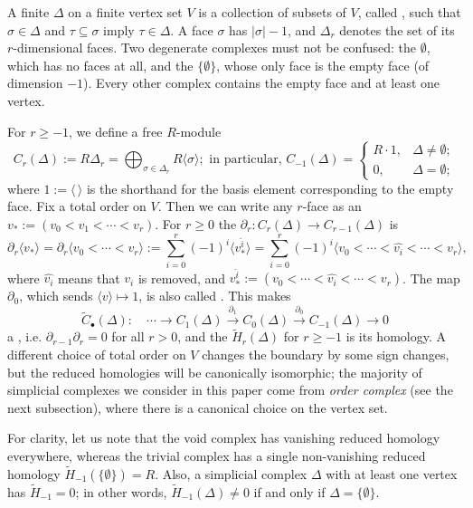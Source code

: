 \documentclass[a4paper,leqno]{amsart}
\begin{document}
A finite  $\Delta$ on a finite vertex set $V$ is a collection of subsets of $V$, called , such that $\sigma\in\Delta$ and $\tau\subseteq\sigma$ imply $\tau\in\Delta$. A face $\sigma$ has  $|\sigma|-1$, and $\Delta_r$ denotes the set of its $r$-dimensional faces. Two degenerate complexes must not be confused: the  $\emptyset$, which has no faces at all, and the  $\{\emptyset\}$, whose only face is the empty face (of dimension $-1$). Every other complex contains the empty face and at least one vertex.

For $r\geq-1$, we define a free $R$-module
\[
C_r(\Delta):= R\Delta_r = \bigoplus_{\sigma\in \Delta_r} R \langle \sigma\rangle; \text{ in particular, }C_{-1}(\Delta)= \begin{cases}
    R \cdot 1, & \Delta\neq \emptyset;\\
    0, & \Delta=\emptyset;
\end{cases}
\]
where $1:=\langle\,\rangle$ is the shorthand for the basis element corresponding to the empty face. 
Fix a total order on $V$.  Then we can write any $r$-face as an   $v_\ast := (v_0<v_1<\cdots <v_r)$. 
For $r\geq0$ the  $\partial_r\colon C_r(\Delta)\to C_{r-1}(\Delta)$ is
\[
\partial_r\langle v_\ast\rangle =\partial_r\langle v_0<\cdots<v_r\rangle:= \sum_{i=0}^{r}(-1)^i \langle v_*^{\widehat{i}}\rangle=\sum_{i=0}^{r}(-1)^i\langle v_0<\cdots<\widehat{v_i}<\cdots<v_r\rangle,
\]
where $\widehat{v_i}$ means that $v_i$ is removed, and $v_*^{\widehat{i}}:=( v_0<\cdots<\widehat{v_i}<\cdots<v_r)$.
The map $\partial_0$, which sends $\langle v\rangle\mapsto 1$, is also called . 
This makes 
\[
\widetilde C_\bullet(\Delta)\colon\quad\cdots\longrightarrow C_1(\Delta)\xrightarrow{\partial_1}C_0(\Delta)\xrightarrow{\partial_0}C_{-1}(\Delta)\longrightarrow0
\]
a , i.e. $\partial_{r-1}\partial_r=0$ for all $r>0$, and the  $\widetilde H_r(\Delta)$ for $r\geq-1$ is its homology.
A different choice of total order on $V$ changes the boundary by some sign changes, but the reduced homologies will be canonically isomorphic; the majority of simplicial complexes we consider in this paper come from \emph{order complex} (see the next subsection), where there is a canonical choice on the vertex set.

For clarity, let us note that the void complex has vanishing reduced homology everywhere, whereas the trivial complex has a single non-vanishing reduced homology $\widetilde{H}_{-1}(\{\emptyset\})=R$. 
Also, a simplicial complex $\Delta$ with at least one vertex has $\widetilde H_{-1}=0$; in other words, $\widetilde H_{-1}(\Delta)\neq0$ if and only if $\Delta=\{\emptyset\}$. 
\end{document}
